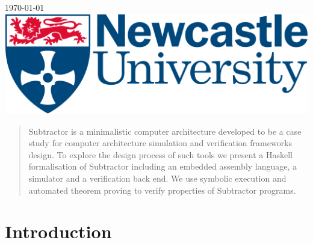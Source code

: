 \begin{titlepage}


{\large \today}\\[2cm] %


\includegraphics[scale=0.5]{logo.png}\\[1cm] %


\vfill %

\end{titlepage}

\begin{abstract}
Subtractor is a minimalistic computer architecture developed to be
a case study for computer architecture simulation and verification frameworks
design. To explore the design process of such tools we present a Haskell formalisation of Subtractor including an embedded assembly language, a simulator and a verification back end. We use symbolic execution and automated theorem proving to verify properties of Subtractor programs.

\end{abstract}

\tableofcontents

\section{Introduction}

